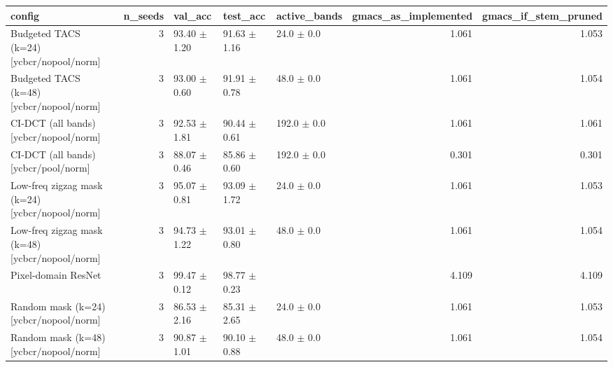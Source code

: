\begin{tabular}{lrlllrr}
\toprule
config & n_seeds & val_acc & test_acc & active_bands & gmacs_as_implemented & gmacs_if_stem_pruned \\
\midrule
Budgeted TACS (k=24) [ycbcr/nopool/norm] & 3 & 93.40 $\pm$ 1.20 & 91.63 $\pm$ 1.16 & 24.0 $\pm$ 0.0 & 1.061 & 1.053 \\
Budgeted TACS (k=48) [ycbcr/nopool/norm] & 3 & 93.00 $\pm$ 0.60 & 91.91 $\pm$ 0.78 & 48.0 $\pm$ 0.0 & 1.061 & 1.054 \\
CI-DCT (all bands) [ycbcr/nopool/norm] & 3 & 92.53 $\pm$ 1.81 & 90.44 $\pm$ 0.61 & 192.0 $\pm$ 0.0 & 1.061 & 1.061 \\
CI-DCT (all bands) [ycbcr/pool/norm] & 3 & 88.07 $\pm$ 0.46 & 85.86 $\pm$ 0.60 & 192.0 $\pm$ 0.0 & 0.301 & 0.301 \\
Low-freq zigzag mask (k=24) [ycbcr/nopool/norm] & 3 & 95.07 $\pm$ 0.81 & 93.09 $\pm$ 1.72 & 24.0 $\pm$ 0.0 & 1.061 & 1.053 \\
Low-freq zigzag mask (k=48) [ycbcr/nopool/norm] & 3 & 94.73 $\pm$ 1.22 & 93.01 $\pm$ 0.80 & 48.0 $\pm$ 0.0 & 1.061 & 1.054 \\
Pixel-domain ResNet & 3 & 99.47 $\pm$ 0.12 & 98.77 $\pm$ 0.23 &  & 4.109 & 4.109 \\
Random mask (k=24) [ycbcr/nopool/norm] & 3 & 86.53 $\pm$ 2.16 & 85.31 $\pm$ 2.65 & 24.0 $\pm$ 0.0 & 1.061 & 1.053 \\
Random mask (k=48) [ycbcr/nopool/norm] & 3 & 90.87 $\pm$ 1.01 & 90.10 $\pm$ 0.88 & 48.0 $\pm$ 0.0 & 1.061 & 1.054 \\
\bottomrule
\end{tabular}

